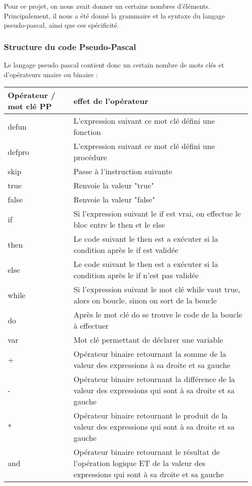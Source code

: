 \documentclass{article}
\begin{document}
Pour ce projet, on nous avait donner un certains nombres d'éléments. Principalement, il nous a été donné la grammaire et la syntaxe du langage pseudo-pascal, ainsi que ces spécificité.

\subsubsection{Structure du code Pseudo-Pascal}

Le langage pseudo pascal contient donc un certain nombre de mots clés et d'opérateurs unaire ou binaire :

\begin{tabular}{|p{2cm}|p{11cm}|}
  \hline
  Opérateur / mot clé PP  & effet de l'opérateur \\
  \hline
  \hline
  defun & L'expression suivant ce mot clé défini une fonction\\ \hline
  defpro & L'expression suivant ce mot clé défini une procédure\\ \hline
  skip & Passe à l'instruction suivante\\ \hline
  true & Renvoie la valeur "true" \\ \hline
  false & Renvoie la valeur "false" \\ \hline
  if & Si l'expression suivant le if est vrai, on effectue le bloc entre le then et le else\\ \hline
  then & Le code suivant le then est a exécuter si la condition après le if est validée\\ \hline
  else & Le code suivant le then est a exécuter si la condition après le if n'est pas validée\\ \hline
  while & Si l'expression suivant le mot clé while vaut true, alors on boucle, sinon on sort de la boucle\\ \hline
  do & Après le mot clé do se trouve le code de la boucle à effectuer\\ \hline
  var & Mot clé permettant de déclarer une variable \\ \hline
  + & Opérateur binaire retournant la somme de la valeur des expressions à sa droite et sa gauche\\ \hline
  - & Opérateur binaire retournant la différence de la valeur des expressions qui sont à sa droite et sa gauche\\ \hline
  * & Opérateur binaire retournant le produit de la valeur des expressions qui sont à sa droite et sa gauche\\ \hline
  and & Opérateur binaire retournant le résultat de l'opération logique ET de la valeur des expressions qui sont à sa droite et sa gauche\\ \hline

\end{tabular}
\end{document}
